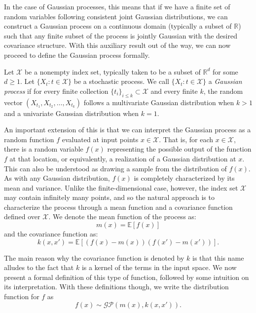 In the case of Gaussian processes, this means that if we have a finite 
set of random variables following consistent joint Gaussian distributions, 
we can construct a Gaussian process on a continuous domain (typically a 
subset of $\mathbb{R}$) such that any finite subset of the process is 
jointly Gaussian with the desired covariance structure. With this 
auxiliary result out of the way, we can now proceed to define the 
Gaussian process formally.

\begin{definition}
	Let $\mathcal{X}$ be a nonempty index set, typically taken to be a 
	subset of $\mathbb{R}^d$ for some $d \geq 1$. Let 
	$\{ X_t : t \in \mathcal{X} \}$ be a stochastic process. We call 
	$\{ X_t : t \in \mathcal{X} \}$ a \textit{Gaussian process} if for 
	every finite collection $\{ t_i \}_{i \leq k} \subset \mathcal{X}$ 
	and every finite $k$, the random vector $(X_{t_1}, X_{t_2}, \ldots, 
	X_{t_k})$ follows a multivariate Gaussian distribution when $k > 1$ 
	and a univariate Gaussian distribution when $k = 1$.
\end{definition}

An important extension of this is that we can interpret the Gaussian 
process as a random function $f$ evaluated at input points $x \in 
\mathcal{X}$. That is, for each $x \in \mathcal{X}$, there is a random 
variable $f(x)$ representing the possible output of the function $f$ at 
that location, or equivalently, a realization of a Gaussian distribution 
at $x$. This can also be understood as drawing a sample from the 
distribution of $f(x)$. As with any Gaussian distribution, $f(x)$ is 
completely characterized by its mean and variance. Unlike the 
finite-dimensional case, however, the index set $\mathcal{X}$ may 
contain infinitely many points, and so the natural approach is to 
characterize the process through a mean function and a covariance 
function defined over $\mathcal{X}$. We denote the mean function of the 
process as:
\[ m(x) = \mathbb{E}[f(x)] \]
and the covariance function as:
\[ k(x, x') = \mathbb{E}[(f(x) - m(x))(f(x') - m(x'))]. \]

The main reason why the covariance function is denoted by $k$ is that this name alludes to the fact that $k$ is a kernel of the terms in the input space. We now present a formal definition of this type of function, followed by some intuition on its interpretation. With these definitions though, we write the distribution function for $f$ as 
\[ f(x) \sim \mathcal{GP}(m(x), k(x,x')). \]

